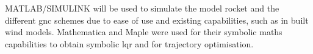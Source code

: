 MATLAB/SIMULINK will be used to simulate the model rocket and the different \gls{gnc} schemes due to ease of use and existing capabilities, such as in built wind models. Mathematica and Maple were used for their symbolic maths capabilities to obtain symbolic \gls{lqr} and for trajectory optimisation.